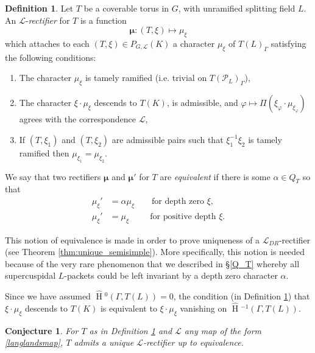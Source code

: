 \documentclass{mrlart7}
\theoremstyle{plain}
\newtheorem{conjecture}[theorem]{Conjecture}
\newcommand{\HT}[1]{\hat{\HH}{}^{#1}}
\theoremstyle{definition}
\newtheorem{definition}[theorem]{Definition}
\numberwithin{equation}{section}
\DeclareMathOperator{\HH}{H}
\newcommand{\PL}{\mathcal{P}_L}
\newcommand{\Lpack}{\mathcal{L}}
\newcommand{\bmu}{\boldsymbol\mu}
\begin{document}
\begin{definition} \label{def:rectifier}
  Let $T$ be a coverable torus in $G$, with unramified splitting field $L$.  An $\Lpack$-\emph{rectifier} for $T$ is a function
  $$\bmu : (T, \xi) \mapsto \mu_{\xi}$$
  which attaches to each $(T, \xi) \in P_{G, \Lpack}(K)$ a character
  $\mu_{\xi}$ of $T(L)_{\Gamma}$ satisfying the following conditions:

\begin{enumerate}
\item The character $\mu_{\xi}$ is tamely ramified (i.e. trivial on
  $T(\PL)_{\Gamma}$),

\item The character $\xi \cdot \mu_{\xi}$ descends to $T(K)$, is admissible,
and $\varphi \mapsto \Pi(\xi_{\varphi} \cdot \mu_{\xi_{\varphi}})$
  agrees with the correspondence $\Lpack$,

\item If $(T, \xi_1)$ and $(T, \xi_2)$ are admissible pairs such that
$\xi_1^{-1} \xi_2$ is tamely ramified then
$\mu_{\xi_1} = \mu_{\xi_2}$.
\end{enumerate}
We say that two rectifiers $\bmu$ and $\bmu'$ for $T$ are \emph{equivalent}
if there is some $\alpha \in Q_T$ so that
\begin{align*}
\mu_\xi' &= \alpha \mu_\xi \qquad \mbox{for depth zero $\xi$,} \\
\mu_\xi' &= \mu_\xi \qquad\ \  \mbox{for positive depth $\xi$.}
\end{align*}

\end{definition}

This notion of equivalence is made in order to prove uniqueness of a $\mathcal{L}_{DR}$-rectifier
(see Theorem \ref{thm:unique_semisimple}).  More specifically, this notion is needed because
of the very rare phenomenon that we described in \S\ref{Q_T} whereby all supercuspidal
$L$-packets could be left invariant by a depth zero character $\alpha$.

Since we have assumed $\HT{0}(\Gamma,T(L)) = 0$, the condition (in Definition \ref{def:rectifier}) that $\xi \cdot \mu_\xi$
descends to $T(K)$ is equivalent to $\xi \cdot \mu_\xi$ vanishing on $\HT{-1}(\Gamma, T(L))$.

\begin{conjecture} \label{conj:unique_rectifier}
For $T$ as in Definition \ref{def:rectifier} and $\Lpack$ any map of the form \eqref{langlandsmap},
$T$ admits a unique $\Lpack$-rectifier up to equivalence.
\end{conjecture}
\end{document}
